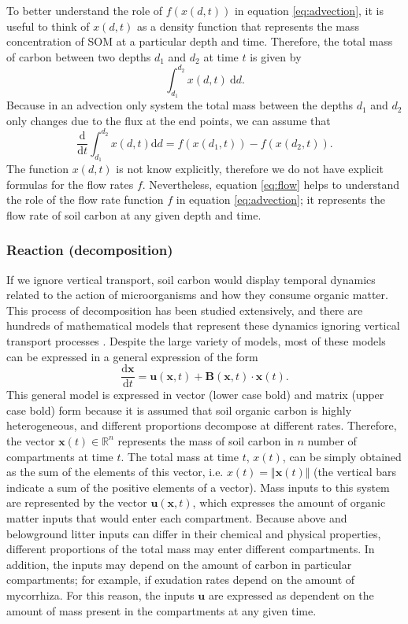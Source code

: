 \documentclass[11pt, oneside, a4paper]{article}   	%
\begin{document}
To better understand the role of $f(x(d, t))$ in equation \ref{eq:advection}, it is useful to think of $x(d, t)$ as a density function \citep{LeVeque1990} that represents the mass concentration of SOM at a particular depth and time. Therefore, the total mass of carbon between two depths $d_1$ and $d_2$ at time $t$ is given by
$$
\int_{d_1}^{d_2} x(d, t) \ \mathrm{d}d.
$$
Because in an advection only system the total mass between the depths $d_1$ and $d_2$ only changes due to the flux at the end points, we can assume that
\begin{equation} \label{eq:flow}
\frac{\mathrm{d}}{\mathrm{d}t} \int_{d_1}^{d_2} x(d, t) \mathrm{d}d = f(x(d_1, t)) -f(x(d_2, t)).
\end{equation}
The function $x(d, t)$ is not know explicitly, therefore we do not have explicit formulas for the flow rates $f$. Nevertheless, equation \ref{eq:flow} helps to understand the role of the flow rate function $f$ in equation \ref{eq:advection}; it represents the flow rate of soil carbon at any given depth and time. 


\subsubsection{Reaction (decomposition)}
If we ignore vertical transport, soil carbon would display temporal dynamics related to the action of microorganisms and how they consume organic matter. This process of decomposition has been studied extensively, and there are hundreds of mathematical models that represent these dynamics ignoring vertical transport processes \citep{Manzoni2009}. Despite the large variety of models, most of these models can be expressed in a general expression of the form \citep{Sierra2015EM, Sierra2018JAMES}
\begin{equation} \label{eq:compartmentalSystem}
\frac{\mathrm{d} \bm{x}}{\mathrm{d}t} = \bm{u}(\bm{x}, t) + \mathbf{B}(\bm{x}, t) \cdot \bm{x}(t) .
\end{equation}
This general model is expressed in vector (lower case bold) and matrix (upper case bold) form because it is assumed that soil organic carbon is highly heterogeneous, and different proportions  decompose at different rates. Therefore, the vector $\bm{x}(t) \in \mathbb{R}^n$ represents the mass of soil carbon in $n$ number of compartments at time $t$. The total mass at time $t$, $x(t)$, can be simply obtained as the sum of the elements of this vector, i.e. $x(t) = \Vert \bm{x}(t) \Vert$ (the vertical bars indicate a sum of the positive elements of a vector). Mass inputs to this system are represented by the vector $\bm{u}(\bm{x}, t)$, which expresses the amount of organic matter inputs that would enter each compartment. Because above and belowground litter inputs can differ in their chemical and physical properties, different proportions of the total mass may enter different compartments. In addition, the inputs may depend on the amount of carbon in particular compartments; for example, if exudation rates depend on the amount of mycorrhiza. For this reason, the inputs $\bm{u}$ are expressed as dependent on the amount of mass present in the compartments at any given time. 
\end{document}
